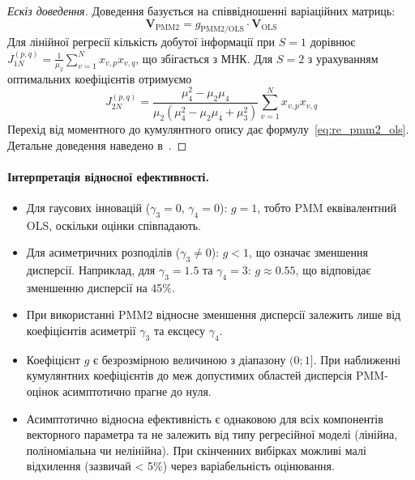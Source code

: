 \documentclass[12pt,a4paper]{article}
\begin{document}
\begin{proof}[Ескіз доведення]
Доведення базується на співвідношенні варіаційних матриць:
\begin{equation}
\mathbf{V}_{\text{PMM2}} = g_{\text{PMM2/OLS}} \cdot \mathbf{V}_{\text{OLS}}
\end{equation}
Для лінійної регресії кількість добутої інформації при $S=1$ дорівнює $J_{1N}^{(p,q)} = \frac{1}{\mu_2}\sum_{v=1}^{N} x_{v,p} x_{v,q}$, що збігається з МНК. Для $S=2$ з урахуванням оптимальних коефіцієнтів отримуємо
\begin{equation}
J_{2N}^{(p,q)} = \frac{\mu_4^2 - \mu_2\mu_4}{\mu_2(\mu_4^2 - \mu_2\mu_4 + \mu_3^2)} \sum_{v=1}^{N} x_{v,p} x_{v,q}
\end{equation}
Перехід від моментного до кумулянтного опису дає формулу~\eqref{eq:re_pmm2_ols}. Детальне доведення наведено в~\cite{kunchenko2002polynomial}.
\end{proof}

\paragraph{Інтерпретація відносної ефективності.}

\begin{itemize}
    \item Для гаусових інновацій ($\gamma_3 = 0$, $\gamma_4 = 0$): $g = 1$, тобто PMM еквівалентний OLS, оскільки оцінки співпадають.

    \item Для асиметричних розподілів ($\gamma_3 \neq 0$): $g < 1$, що означає зменшення дисперсії. Наприклад, для $\gamma_3 = 1.5$ та $\gamma_4 = 3$: $g \approx 0.55$, що відповідає зменшенню дисперсії на 45\%.

    \item При використанні PMM2 відносне зменшення дисперсії залежить лише від коефіцієнтів асиметрії $\gamma_3$ та ексцесу $\gamma_4$.

    \item Коефіцієнт $g$ є безрозмірною величиною з діапазону $(0;1]$. При наближенні кумулянтних коефіцієнтів до меж допустимих областей дисперсія PMM-оцінок асимптотично прагне до нуля.

    \item Асимптотично відносна ефективність є однаковою для всіх компонентів векторного параметра та не залежить від типу регресійної моделі (лінійна, поліноміальна чи нелінійна). При скінченних вибірках можливі малі відхилення (зазвичай < 5\%) через варіабельність оцінювання.
\end{itemize}
\end{document}
